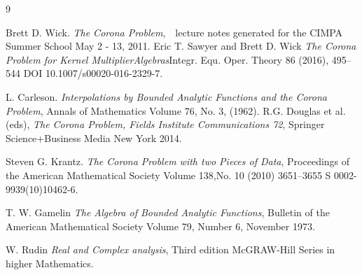 \documentclass[reqno, 12pt]{amsart}
\theoremstyle{definition}
\theoremstyle{definition}
\begin{document}
\begin{thebibliography}{9}

Brett D. Wick.
\emph{The Corona Problem},~~lecture notes generated for the CIMPA Summer School May 2 - 13, 2011.
Eric T. Sawyer and Brett D. Wick
\emph{The Corona Problem for Kernel MultiplierAlgebras}Integr. Equ. Oper. Theory 86 (2016), 495–544 DOI 10.1007/s00020-016-2329-7.

L. Carleson.
\emph{Interpolations by Bounded Analytic Functions and the Corona Problem}, Annals of Mathematics Volume 76, No. 3, (1962).
R.G. Douglas et al. (eds),  
\emph{The Corona Problem, Fields Institute Communications 72}, Springer Science+Business Media New York 2014. 


Steven G. Krantz.
\emph{The Corona Problem with two Pieces of Data}, Proceedings of the American Mathematical Society Volume 138,No. 10 (2010) 3651–3655 S 0002-9939(10)10462-6. 



T. W. Gamelin
\emph{The Algebra of Bounded Analytic Functions}, Bulletin of the American Mathematical Society Volume 79, Number 6, November 1973. 

 
 W. Rudin
\emph{Real and Complex analysis}, Third edition McGRAW-Hill Series in higher Mathematics. 






\end{thebibliography}


 
 
\end{document}

